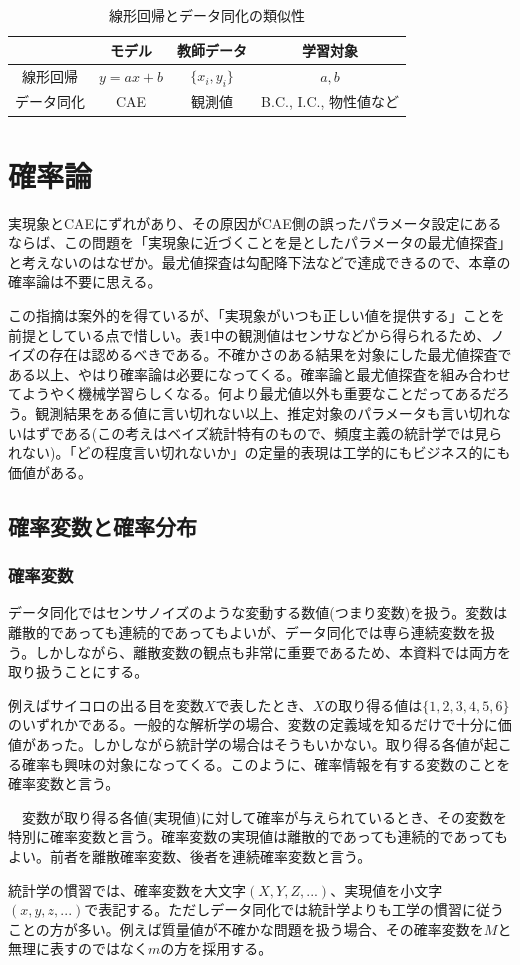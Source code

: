 \documentclass[dvipdfmx, 9pt, a4paper]{jsarticle}
\begin{document}
\begin{table}[b]
\begin{center}
\caption{線形回帰とデータ同化の類似性}
\begin{tabular}{c|ccc}
\hline
 & モデル & 教師データ & 学習対象 \\ \hline
線形回帰 & $y=ax+b$ & $\{ x_i, y_i \}$ & $a, b$ \\
データ同化 & CAE & 観測値 & B.C., I.C., 物性値など \\ \hline
\end{tabular}
\end{center}
\end{table}

\section{確率論}
実現象とCAEにずれがあり、その原因がCAE側の誤ったパラメータ設定にあるならば、この問題を「実現象に近づくことを是としたパラメータの最尤値探査」と考えないのはなぜか。最尤値探査は勾配降下法などで達成できるので、本章の確率論は不要に思える。\par
この指摘は案外的を得ているが、「実現象がいつも正しい値を提供する」ことを前提としている点で惜しい。表1中の観測値はセンサなどから得られるため、ノイズの存在は認めるべきである。不確かさのある結果を対象にした最尤値探査である以上、やはり確率論は必要になってくる。確率論と最尤値探査を組み合わせてようやく機械学習らしくなる。何より最尤値以外も重要なことだってあるだろう。観測結果をある値に言い切れない以上、推定対象のパラメータも言い切れないはずである(この考えはベイズ統計特有のもので、頻度主義の統計学では見られない)。「どの程度言い切れないか」の定量的表現は工学的にもビジネス的にも価値がある。

\subsection{確率変数と確率分布}
\subsubsection{確率変数}
データ同化ではセンサノイズのような変動する数値(つまり変数)を扱う。変数は離散的であっても連続的であってもよいが、データ同化では専ら連続変数を扱う。しかしながら、離散変数の観点も非常に重要であるため、本資料では両方を取り扱うことにする。\par
例えばサイコロの出る目を変数$X$で表したとき、$X$の取り得る値は$\{ 1,2,3,4,5,6 \}$のいずれかである。一般的な解析学の場合、変数の定義域を知るだけで十分に価値があった。しかしながら統計学の場合はそうもいかない。取り得る各値が起こる確率も興味の対象になってくる。このように、確率情報を有する変数のことを確率変数と言う。
\begin{tcolorbox}[title=確率変数]
　変数が取り得る各値(実現値)に対して確率が与えられているとき、その変数を特別に確率変数と言う。確率変数の実現値は離散的であっても連続的であってもよい。前者を離散確率変数、後者を連続確率変数と言う。
\end{tcolorbox}
統計学の慣習では、確率変数を大文字$(X, Y, Z, ...)$、実現値を小文字$(x, y, z, ...)$で表記する。ただしデータ同化では統計学よりも工学の慣習に従うことの方が多い。例えば質量値が不確かな問題を扱う場合、その確率変数を$M$と無理に表すのではなく$m$の方を採用する。\bigskip
\end{document}
